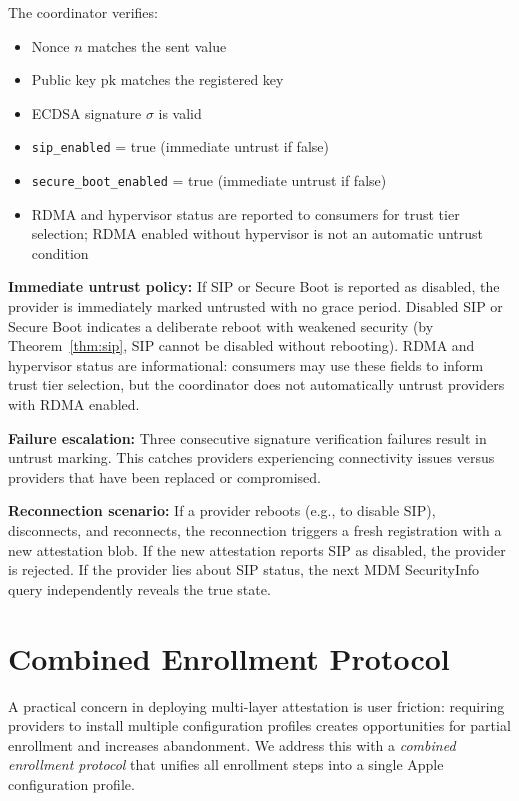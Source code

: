 \documentclass[10pt,twocolumn,letterpaper]{article}
\begin{document}
The coordinator verifies:
\begin{itemize}[leftmargin=*,itemsep=1pt]
    \item Nonce $n$ matches the sent value
    \item Public key $\text{pk}$ matches the registered key
    \item ECDSA signature $\sigma$ is valid
    \item \texttt{sip\_enabled} = true (immediate untrust if false)
    \item \texttt{secure\_boot\_enabled} = true (immediate untrust if false)
    \item RDMA and hypervisor status are reported to consumers for trust tier selection; RDMA enabled without hypervisor is not an automatic untrust condition
\end{itemize}

\textbf{Immediate untrust policy:} If SIP or Secure Boot is reported as disabled, the provider is immediately marked untrusted with no grace period. Disabled SIP or Secure Boot indicates a deliberate reboot with weakened security (by Theorem~\ref{thm:sip}, SIP cannot be disabled without rebooting). RDMA and hypervisor status are informational: consumers may use these fields to inform trust tier selection, but the coordinator does not automatically untrust providers with RDMA enabled.

\textbf{Failure escalation:} Three consecutive signature verification failures result in untrust marking. This catches providers experiencing connectivity issues versus providers that have been replaced or compromised.

\textbf{Reconnection scenario:} If a provider reboots (e.g., to disable SIP), disconnects, and reconnects, the reconnection triggers a fresh registration with a new attestation blob. If the new attestation reports SIP as disabled, the provider is rejected. If the provider lies about SIP status, the next MDM SecurityInfo query independently reveals the true state.

\section{Combined Enrollment Protocol}
\label{sec:enrollment}

A practical concern in deploying multi-layer attestation is user friction: requiring providers to install multiple configuration profiles creates opportunities for partial enrollment and increases abandonment. We address this with a \emph{combined enrollment protocol} that unifies all enrollment steps into a single Apple configuration profile.
\end{document}
